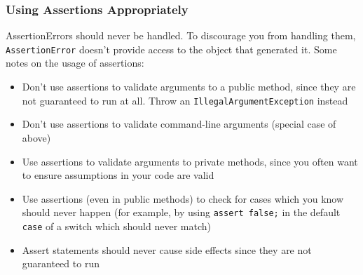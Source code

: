 \subsubsection{Using Assertions Appropriately}
AssertionErrors should never be handled. To discourage you from handling them, 
\verb#AssertionError# doesn't provide access to the object that generated it.  
Some notes on the usage of assertions:
\begin{itemize}
    \item Don't use assertions to validate arguments to a public method, since 
    they are not guaranteed to run at all. Throw an 
    \verb#IllegalArgumentException# instead
    \item Don't use assertions to validate command-line arguments (special case 
    of above)
    \item Use assertions to validate arguments to private methods, since you 
    often want to ensure assumptions in your code are valid
    \item Use assertions (even in public methods) to check for cases which you 
    know should never happen (for example, by using \verb#assert false;# in the 
    default \verb#case# of a switch which should never match)
    \item Assert statements should never cause side effects since they are not 
    guaranteed to run
\end{itemize}
